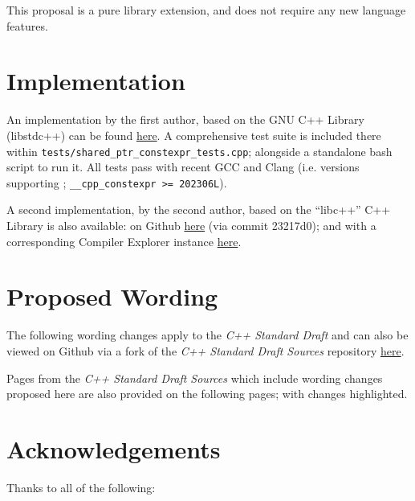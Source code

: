 \documentclass[10pt]{article}
\newcommand*{\upstreamcommit}{4dd513d}
\newcommand*{\forkcommit}{4b5d3cf}
\begin{document}
This proposal is a pure library extension, and does not require any new
language features.

\section{Implementation}

An implementation by the first author, based on the GNU C++ Library (libstdc++)
can be found \href{https://github.com/SCT4SP/constexpr_shared_ptr}{here}. A
comprehensive test suite is included there within
\texttt{tests/shared\_ptr\_constexpr\_tests.cpp}; alongside a standalone bash
script to run it. All tests pass with recent GCC and Clang (i.e. versions
supporting \cite{P2738R1}; \texttt{\_\_cpp\_constexpr >= 202306L}).

A second implementation, by the second author, based on the ``libc++'' C++
Library is also available: on Github
\href{https://github.com/hanickadot/llvm-project/tree/P3309-constexpr-atomic-and-atomic-ref}{here}
(via commit 23217d0); and with a corresponding Compiler Explorer instance
\href{https://compiler-explorer.com/z/8cj7nc1no}{here}.

\section{Proposed Wording}
\label{sec:wording}

The following wording changes apply to the \emph{C++ Standard Draft} and can
also be viewed on Github via a fork of the \emph{C++ Standard Draft Sources}
repository
\href{https://github.com/cplusplus/draft/compare/\upstreamcommit...pkeir:draft:\forkcommit}{here}.

Pages from the \emph{C++ Standard Draft Sources} which include wording changes
proposed here are also provided on the following pages; with changes
highlighted.


\section{Acknowledgements}

Thanks to all of the following:
\end{document}
